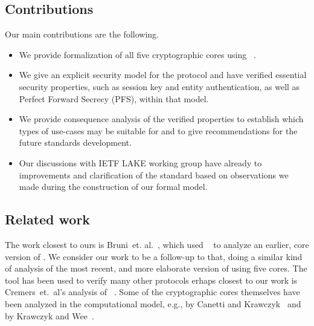 \documentclass[runningheads,draft,x11names]{llncs}
\begin{document}
\subsection{Contributions}
\label{sec:contributions}
Our main contributions are the following.
\begin{itemize}
    \item We provide formalization of all five cryptographic cores 
        using \mTamarin~\cite{DBLP:conf/cav/MeierSCB13}.
    \item We give an explicit security model for the protocol and have verified
        essential security properties, such as session key and entity
        authentication, as well as Perfect Forward Secrecy (PFS), within that
        model.
    \item We provide consequence analysis of the verified properties to
        establish which types of use-cases \mEdhoc{} may be suitable for and
        to give recommendations for the future standards development.
    \item Our discussions with  IETF LAKE working group have already
         to improvements and clarification of the standard \mSpec{} based
        on observations we made during the construction of our formal model.
\end{itemize}

\subsection{Related work}
\label{sec:relatedWork}
The work closest to ours is Bruni~et. al.~\cite{DBLP:conf/secsr/BruniJPS18},
which used \mProverif~\cite{DBLP:conf/csfw/Blanchet01} to analyze an earlier,
 core\vedit{,}{} version of \mEdhoc.
%
We consider our work to be a  follow-up to that, doing a similar kind of
analysis of the most recent, and more elaborate\vedit{,}{} version of \mEdhoc{} using five
cores.
%
%
The \mTamarin{} tool has been used to verify many other protocols erhaps closest
to our work is Cremers~et.~al's analysis of
\mTls~\cite{DBLP:conf/ccs/CremersHHSM17}.
%
Some of the cryptographic cores themselves have been analyzed in the
computational model, e.g., \mSigma{} by Canetti and
Krawczyk~\cite{DBLP:conf/crypto/CanettiK02} and \mOptls{} by Krawczyk and
Wee~\cite{DBLP:conf/eurosp/KrawczykW16}.
%
\end{document}
